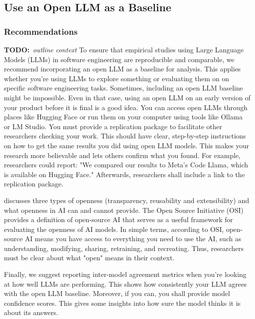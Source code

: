 \documentclass[11pt]{article}
\newcommand{\todo}[1]{{\textbf{TODO:}\ \textit{#1}}} %
\begin{document}
\subsection{Use an Open LLM as a Baseline}

\subsubsection{Recommendations}

\todo{outline context}
To ensure that empirical studies using Large Language Models (LLMs) in software engineering are reproducible and comparable, we recommend incorporating an open LLM as a baseline for analysis. This applies whether you're using LLMs to explore something or evaluating them on on specific software engineering tasks. 
Sometimes, including an open LLM baseline might be impossible. Even in that case, using an open LLM on an early version of your product before it is final is a good idea.
You can access open LLMs through places like Hugging Face or run them on your computer using tools like Ollama or LM Studio. 
You must provide a replication package to facilitate other researchers checking your work. This should have clear, step-by-step instructions on how to get the same results you did using open LLM models. This makes your research more believable and lets others confirm what you found. For example, researchers could report: "We compared our results to Meta's Code Llama, which is available on Hugging Face." Afterwards, researchers shall include a link to the replication package.

\citep{widder2024open} discusses three types of openness (transparency, reusability and extensibility) and  what openness in AI can and cannot provide. The Open Source Initiative (OSI) \cite{OSIAI2024} provides a definition of open-source AI that serves as a useful framework for evaluating the openness of AI models. In simple terms, according to OSI, open-source AI means you have access to everything you need to use the AI, such as understanding, modifying, sharing, retraining, and recreating. Thus, researchers must be clear about what "open" means in their context.

Finally, we suggest reporting inter-model agreement metrics when you're looking at how well LLMs are performing. This shows how consistently your LLM agrees with the open LLM baseline. Moreover, if you can, you shall provide model confidence scores. This gives some insights into how sure the model thinks it is about its answers. 
\end{document}

